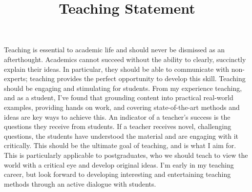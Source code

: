\documentclass[12pt]{article}
\title{Teaching Statement}
\date{}
\author{}
\begin{document}
\maketitle
\thispagestyle{empty}


Teaching is essential to academic life and should never be dismissed as an afterthought.
%
Academics cannot succeed without the ability to clearly, succinctly explain their ideas.
%
In particular, they should be able to communicate with non-experts; teaching provides the perfect opportunity to develop this skill.
%
Teaching should be engaging and stimulating for students.
%
From my experience teaching, and as a student, I've found that grounding content into practical real-world examples, providing hands on work, and covering state-of-the-art methods and ideas are key ways to achieve this.
%
An indicator of a teacher's success is the questions they receive from students.
% 
If a teacher receives novel, challenging questions, the students have understood the material and are engaging with it critically.
%
This should be the ultimate goal of teaching, and is what I aim for.
%
This is particularly applicable to postgraduates, who we should teach to view the world with a critical eye and develop original ideas.
%
I'm early in my teaching career, but look forward to developing interesting and entertaining teaching methods through an active dialogue with students.
\end{document}
